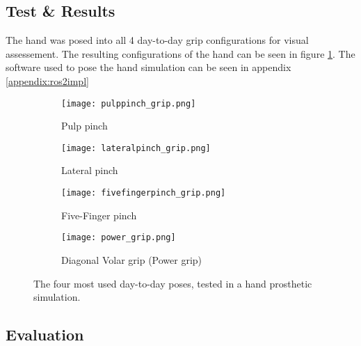 \documentclass[../main.tex]{subfiles}
\begin{document}
\subsection{Test \& Results}

The hand was posed into all 4 day-to-day grip configurations for visual assessement.
The resulting configurations of the hand can be seen in figure  \ref{fig:hand_pose_test}.
The software used to pose the hand simulation can be seen in appendix \ref{appendix:ros2impl} 

\begin{figure}
    \centering
    \begin{subfigure}[b]{0.49\textwidth}
        \centering
        \texttt{[image: pulppinch\_grip.png]}
        \caption{Pulp pinch}
    \end{subfigure}
    \hfill
    \centering
    \begin{subfigure}[b]{0.49\textwidth}
        \centering
        \texttt{[image: lateralpinch\_grip.png]}
        \caption{Lateral pinch}
    \end{subfigure}
    \hfill
    \begin{subfigure}[b]{0.49\textwidth}
        \centering
        \texttt{[image: fivefingerpinch\_grip.png]}
        \caption{Five-Finger pinch}
    \end{subfigure}
    \hfill
    \begin{subfigure}[b]{0.49\textwidth}
        \centering
        \texttt{[image: power\_grip.png]}
        \caption{Diagonal Volar grip (Power grip)}
    \end{subfigure}
    \caption{The four most used day-to-day poses, tested in a hand prosthetic simulation.}
    \label{fig:hand_pose_test}
\end{figure}



\subsection{Evaluation}
\end{document}
